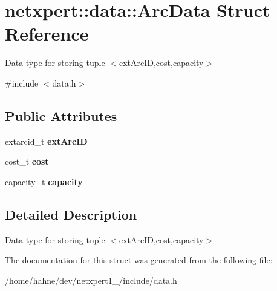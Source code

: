 \hypertarget{structnetxpert_1_1data_1_1ArcData}{}\section{netxpert\+:\+:data\+:\+:Arc\+Data Struct Reference}
\label{structnetxpert_1_1data_1_1ArcData}


Data type for storing tuple $<$ext\+Arc\+ID,cost,capacity$>$  




{\ttfamily \#include $<$data.\+h$>$}

\subsection*{Public Attributes}
\begin{DoxyCompactItemize}
\item 
extarcid\+\_\+t {\bfseries ext\+Arc\+ID}\hypertarget{structnetxpert_1_1data_1_1ArcData_a4c603f3de6c3c9ee08a2ac45836f6286}{}\label{structnetxpert_1_1data_1_1ArcData_a4c603f3de6c3c9ee08a2ac45836f6286}

\item 
cost\+\_\+t {\bfseries cost}\hypertarget{structnetxpert_1_1data_1_1ArcData_ae38fb11a0653da4cfa0876d21d962515}{}\label{structnetxpert_1_1data_1_1ArcData_ae38fb11a0653da4cfa0876d21d962515}

\item 
capacity\+\_\+t {\bfseries capacity}\hypertarget{structnetxpert_1_1data_1_1ArcData_a6c8e181912f8d90325dafc5ce6c2bc44}{}\label{structnetxpert_1_1data_1_1ArcData_a6c8e181912f8d90325dafc5ce6c2bc44}

\end{DoxyCompactItemize}


\subsection{Detailed Description}
Data type for storing tuple $<$ext\+Arc\+ID,cost,capacity$>$ 

The documentation for this struct was generated from the following file\+:\begin{DoxyCompactItemize}
\item 
/home/hahne/dev/netxpert1\+\_/include/data.\+h\end{DoxyCompactItemize}
